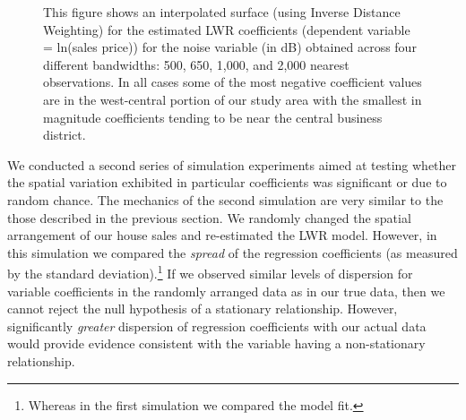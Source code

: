 \documentclass{article}\usepackage{graphicx, color}
\begin{document}
\begin{figure}
 \caption{This figure shows an interpolated surface (using Inverse Distance Weighting) for the estimated LWR coefficients (dependent variable = ln(sales price)) for the noise variable (in dB) obtained across four different bandwidths: 500, 650, 1,000, and 2,000 nearest observations. In all cases some of the most negative coefficient values are in the west-central portion of our study area with the smallest in magnitude coefficients tending to be near the central business district.}
 \label{fig:NoiseBetas}
\end{figure}

We conducted a second series of simulation experiments aimed at testing whether the spatial variation exhibited in particular coefficients was significant or due to random chance. The mechanics of the second simulation are very similar to the those described in the previous section. We randomly changed the spatial arrangement of our house sales and re-estimated the LWR model. However, in this simulation we compared the \emph{spread} of the regression coefficients (as measured by the standard deviation).\footnote{Whereas in the first simulation we compared the model fit.} If we observed similar levels of dispersion for variable coefficients in the randomly arranged data as in our true data, then we cannot reject the null hypothesis of a stationary relationship. However, significantly \emph{greater} dispersion of regression coefficients with our actual data would provide evidence consistent with the variable having a non-stationary relationship. 
\end{document}
